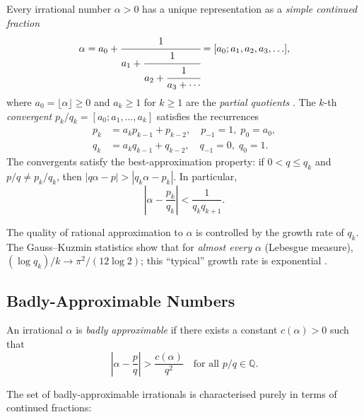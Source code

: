 Every irrational number $\alpha > 0$ has a unique
representation as a \emph{simple continued fraction}
\begin{equation}\label{eq:cf-expansion}
  \alpha = a_0 + \cfrac{1}{a_1 + \cfrac{1}{a_2 + \cfrac{1}{a_3 + \cdots}}}
         = [a_0; a_1, a_2, a_3, \ldots],
\end{equation}
where $a_0 = \lfloor \alpha \rfloor \geq 0$ and
$a_k \geq 1$ for $k \geq 1$ are the \emph{partial
quotients} \cite{khinchin_continued_fractions}.
The $k$-th \emph{convergent} $p_k/q_k = [a_0;a_1,\ldots,a_k]$
satisfies the recurrences
\begin{align}
  p_k &= a_k p_{k-1} + p_{k-2},\quad
  p_{-1} = 1,\; p_0 = a_0, \label{eq:cf-pk}\\
  q_k &= a_k q_{k-1} + q_{k-2},\quad
  q_{-1} = 0,\; q_0 = 1. \label{eq:cf-qk}
\end{align}
The convergents satisfy the best-approximation
property: if $0 < q \leq q_k$ and $p/q \neq p_k/q_k$,
then $|q\alpha - p| > |q_k \alpha - p_k|$.
In particular,
\begin{equation}\label{eq:cf-best-approx}
  \left|\alpha - \frac{p_k}{q_k}\right|
  < \frac{1}{q_k q_{k+1}}.
\end{equation}

The quality of rational approximation to $\alpha$
is controlled by the growth rate of $q_k$.  The
Gauss--Kuzmin statistics show that for
\emph{almost every} $\alpha$ (Lebesgue measure),
$(\log q_k)/k \to \pi^2/(12 \log 2)$; this
``typical'' growth rate is exponential
\cite{khinchin_continued_fractions}.

\subsection{Badly-Approximable Numbers}
\label{subsec:badly-approx}

\begin{definition}\label{def:badly-approx}
An irrational $\alpha$ is \emph{badly approximable}
if there exists a constant $c(\alpha) > 0$ such that
\begin{equation}\label{eq:badly-approx-def}
  \left|\alpha - \frac{p}{q}\right| > \frac{c(\alpha)}{q^2}
  \quad \text{for all } p/q \in \mathbb{Q}.
\end{equation}
\end{definition}

The set of badly-approximable irrationals is
characterised purely in terms of continued fractions:

